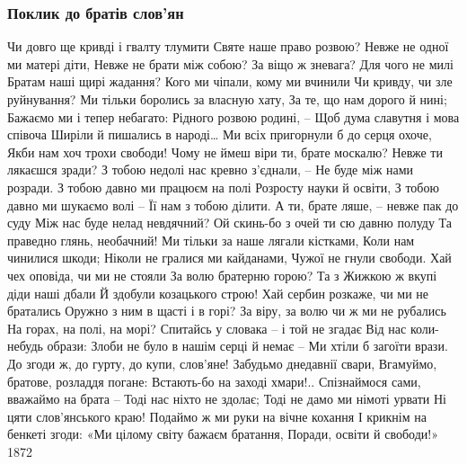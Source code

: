  
 
 

\subsubsection{Поклик до братів слов’ян}


Чи довго ще кривді і гвалту тлумити
Святе наше право розвою?
Невже не одної ми матері діти,
Невже не брати між собою?
За віщо ж зневага? Для чого не милі
Братам наші щирі жадання?
Кого ми чіпали, кому ми вчинили
Чи кривду, чи зле руйнування?
Ми тільки боролись за власную хату,
За те, що нам дорого й нині;
Бажаємо ми і тепер небагато:
Рідного розвою родині, –
Щоб дума славутня і мова співоча
Ширіли й пишались в народі…
Ми всіх пригорнули б до серця охоче,
Якби нам хоч трохи свободи!
Чому не ймеш віри ти, брате москалю?
Невже ти лякаєшся зради?
З тобою недолі нас кревно з’єднали, –
Не буде між нами розради.
З тобою давно ми працюєм на полі
Розросту науки й освіти,
З тобою давно ми шукаємо волі –
Її нам з тобою ділити.
А ти, брате ляше, – невже пак до суду
Між нас буде нелад невдячний?
Ой скинь-бо з очей ти сю давню полуду
Та праведно глянь, необачний!
Ми тільки за наше лягали кістками,
Коли нам чинилися шкоди;
Ніколи не гралися ми кайданами,
Чужої не гнули свободи.
Хай чех оповіда, чи ми не стояли
За волю братерню горою?
Та з Жижкою ж вкупі діди наші дбали
Й здобули козацького строю!
Хай сербин розкаже, чи ми не братались
Оружно з ним в щасті і в горі?
За віру, за волю чи ж ми не рубались
На горах, на полі, на морі?
Спитайсь у словака – і той не згадає
Від нас коли-небудь образи:
Злоби не було в нашім серці й немає –
Ми хтіли б загоїти врази.
До згоди ж, до гурту, до купи, слов’яне!
Забудьмо днедавнії свари,
Вгамуймо, братове, розладдя погане:
Встають-бо на заході хмари!..
Спізнаймося сами, вважаймо на брата –
Тоді нас ніхто не здолає;
Тоді не дамо ми німоті урвати
Ні цяти слов’янського краю!
Подаймо ж ми руки на вічне кохання
І крикнім на бенкеті згоди:
«Ми цілому світу бажаєм братання,
Поради, освіти й свободи!»
1872 
